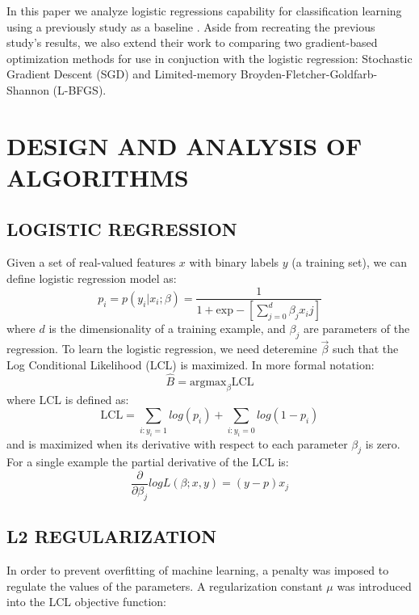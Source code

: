 In this paper we analyze logistic regressions capability for classification learning using a previously study as a baseline \cite{t-logistic}. Aside from recreating the previous study's results, we also extend their work to comparing two gradient-based optimization methods for use in conjuction with the logistic regression: Stochastic Gradient Descent (SGD) and Limited-memory Broyden-Fletcher-Goldfarb-Shannon (L-BFGS).



\section{DESIGN AND ANALYSIS OF ALGORITHMS}
\label{sec:algorithms}

\subsection{LOGISTIC REGRESSION}
Given a set of real-valued features $x$ with binary labels $y$ (a training set), we can define logistic regression model as: 
\begin{equation}
    p_i = p( y_i | x_i ; \beta )  = \frac{1}{1 + \textrm{exp}-[\sum_{j=0}^d \beta_j x_ij]}
\end{equation}
where $d$ is the dimensionality of a training example, and $\beta_j$ are parameters of the regression. To learn the logistic regression, we need deteremine $\vec\beta$ such that the Log Conditional Likelihood (LCL) is maximized. In more formal notation:
\begin{equation}
   \widehat{B} = \textrm{argmax}_{\beta} \textrm{LCL}
\end{equation}
where LCL is defined as:
\begin{equation}
    \textrm{LCL} = \sum_{i:y_i=1} log (p_i) + \sum_{i:y_i=0} log (1-p_i)
\end{equation}
and is maximized when its derivative with respect to each parameter $\beta_j$ is zero. For a single example the partial derivative of the LCL is:
\begin{equation}
    \frac{\partial}{\partial \beta_j} log L(\beta ; x, y) = (y - p) x_j
\end{equation}


\subsection{L2 REGULARIZATION}
In order to prevent overfitting of machine learning, a penalty was imposed to regulate the values of the parameters. A regularization constant $\mu$ was introduced into the LCL objective function:

